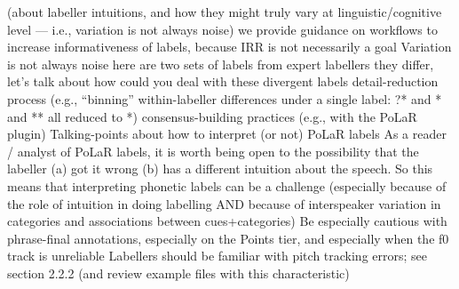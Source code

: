{}\markdownRendererUlBeginTight
\markdownRendererUlItem (about labeller intuitions, and how they might truly vary at linguistic/cognitive level — i.e., variation is not always noise)\markdownRendererUlItemEnd 
\markdownRendererUlEndTight \markdownRendererUlItemEnd 
\markdownRendererUlEndTight \markdownRendererUlItemEnd 
\markdownRendererUlItem we provide guidance on workflows to increase informativeness of labels, because IRR is not necessarily a goal\markdownRendererInterblockSeparator
{}\markdownRendererUlBeginTight
\markdownRendererUlItem {}\markdownRendererUlItemEnd 
\markdownRendererUlItem Variation is not always noise\markdownRendererInterblockSeparator
{}\markdownRendererUlBeginTight
\markdownRendererUlItem here are two sets of labels from expert labellers\markdownRendererUlItemEnd 
\markdownRendererUlItem they differ, let’s talk about how could you deal with these divergent labels\markdownRendererInterblockSeparator
{}\markdownRendererUlBeginTight
\markdownRendererUlItem detail-reduction process (e.g., “binning” within-labeller differences under a single label: ?* and * and ** all reduced to *)\markdownRendererUlItemEnd 
\markdownRendererUlItem consensus-building practices (e.g., with the PoLaR plugin)\markdownRendererUlItemEnd 
\markdownRendererUlEndTight \markdownRendererUlItemEnd 
\markdownRendererUlEndTight \markdownRendererUlItemEnd 
\markdownRendererUlItem {}\markdownRendererUlItemEnd 
\markdownRendererUlEndTight \markdownRendererUlItemEnd 
\markdownRendererUlItem Talking-points about how to interpret (or not) PoLaR labels\markdownRendererInterblockSeparator
{}\markdownRendererUlBeginTight
\markdownRendererUlItem As a reader / analyst of PoLaR labels, it is worth being open to the possibility that the labeller (a) got it wrong  (b) has a different intuition about the speech. So this means that interpreting phonetic labels can be a challenge (especially because of the role of intuition in doing labelling AND because of interspeaker variation in categories and associations between cues+categories)\markdownRendererUlItemEnd 
\markdownRendererUlItem Be especially cautious with phrase-final annotations, especially on the Points tier, and especially when the f0 track is unreliable\markdownRendererInterblockSeparator
{}\markdownRendererUlBeginTight
\markdownRendererUlItem Labellers should be familiar with pitch tracking errors; see section 2.2.2 (and review example files with this characteristic)\markdownRendererUlItemEnd 
